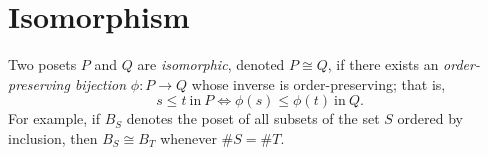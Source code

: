 \section{Isomorphism}

Two posets $P$ and $Q$ are \emph{isomorphic}, denoted $P \cong Q$, if there exists an \emph{order-preserving bijection} $\phi : P \to Q$ whose inverse is order-preserving; that is, $$s \leq t~\text{in}~P \iff \phi(s) \leq \phi(t)~\text{in}~Q.$$ For example, if $B_S$ denotes the poset of all subsets of the set $S$ ordered by inclusion, then $B_S \cong B_T$ whenever $\#S = \#T$.